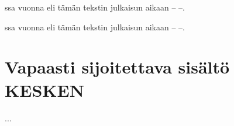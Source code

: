 \begin{koodilohkosis}
ssa vuonna 
eli tämän tekstin julkaisun aikaan -- --.
\end{koodilohkosis}

\begin{tulossis}
  ssa vuonna 
  eli tämän tekstin julkaisun aikaan -- --.
\end{tulossis}

\section{Vapaasti sijoitettava sisältö KESKEN}

...
